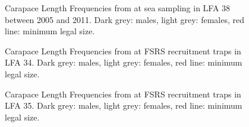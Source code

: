 \documentclass[11pt]{article}
\newcommand{\e}{\string~/bio.data/bio.lobster/figures/} %
\newcommand{\ebh}{\string~/bio.data/bio.lobster/figures/LFA3438Framework2019/} %
\begin{document}
   \begin{figure}
    \centering
        \caption{Carapace Length Frequencies from at sea sampling in LFA 38 between 2005 and 2011. Dark grey: males, light grey: females, red line: minimum legal size.}

    \end{figure}

 
%        

    \begin{figure}
    \centering
        \caption{Carapace Length Frequencies from at FSRS recruitment traps in LFA 34. Dark grey: males, light grey: females, red line: minimum legal size.}

    \end{figure}


    \begin{figure}
    \centering
        \caption{Carapace Length Frequencies from at FSRS recruitment traps in LFA 35. Dark grey: males, light grey: females, red line: minimum legal size.}

    \end{figure}



\end{document}
